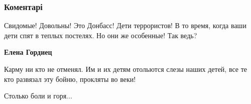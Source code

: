  
 
 
 
 
\subsubsection{Коментарі}

\begin{itemize} %

Свидомые! Довольны! Это Донбасс! Дети террористов! В то время, когда ваши дети
спят в теплых постелях. Но они же особенные! Так ведь?

\textbf{Елена Гордиец}

Карму ни кто не отменял. Им и их детям отольются слезы наших детей, все те кто
развязал эту бойню, прокляты во веки!

Столько боли и горя...
\end{itemize} %
